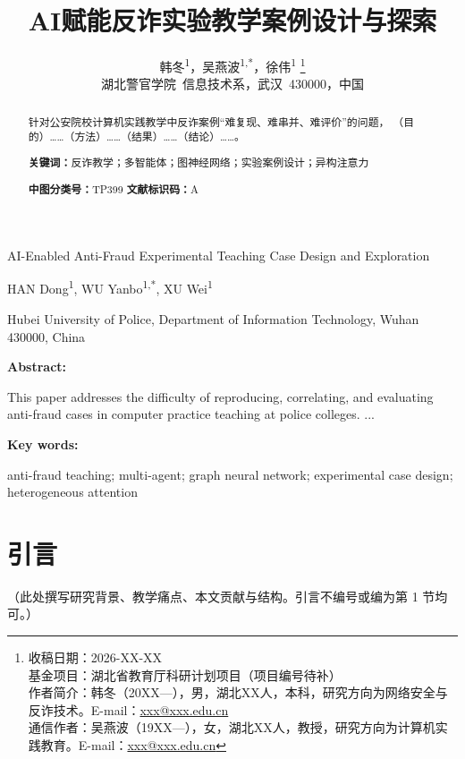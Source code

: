 \documentclass[12pt,a4paper]{ctexart}
\title{AI赋能反诈实验教学案例设计与探索}
\author{%
  韩冬\textsuperscript{1}，吴燕波\textsuperscript{1,*}，徐伟\textsuperscript{1}%
  \thanks{%
    收稿日期：2026-XX-XX\\
    基金项目：湖北省教育厅科研计划项目（项目编号待补）\\
    作者简介：韩冬（20XX—），男，湖北XX人，本科，研究方向为网络安全与反诈技术。E-mail：\href{mailto:xxx@xxx.edu.cn}{xxx@xxx.edu.cn}\\
    通信作者：吴燕波（19XX—），女，湖北XX人，教授，研究方向为计算机实践教育。E-mail：\href{mailto:xxx@xxx.edu.cn}{xxx@xxx.edu.cn}%
  }%
  \\%
  湖北警官学院~信息技术系，武汉~430000，中国%
}
\date{}
\begin{document}
\vspace*{-1.0cm}
\maketitle

\begin{abstract}
针对公安院校计算机实践教学中反诈案例“难复现、难串并、难评价”的问题，
（目的）……（方法）……（结果）……（结论）……。

\par\noindent\textbf{关键词：}反诈教学；多智能体；图神经网络；实验案例设计；异构注意力
\par\noindent\textbf{中图分类号：}TP399 \quad \textbf{文献标识码：}A
\end{abstract}

\vspace{1em}
\begin{center}
  {\heiti\Large AI-Enabled Anti-Fraud Experimental Teaching Case Design and Exploration}

  \vspace{0.5em}
  {\normalsize HAN Dong\textsuperscript{1}, WU Yanbo\textsuperscript{1,*}, XU Wei\textsuperscript{1}}

  {\small Hubei University of Police, Department of Information Technology, Wuhan 430000, China}
\end{center}

\begin{center}\textbf{Abstract:}\end{center}
This paper addresses the difficulty of reproducing, correlating, and evaluating
anti-fraud cases in computer practice teaching at police colleges. ...
\begin{center}\textbf{Key words:}\end{center}
anti-fraud teaching; multi-agent; graph neural network; experimental case design; heterogeneous attention

\section{引言}
（此处撰写研究背景、教学痛点、本文贡献与结构。引言不编号或编为第 1 节均可。）
\end{document}
